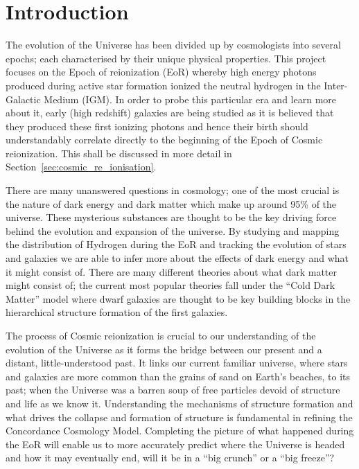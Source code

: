 
\section{Introduction} %
\label{section:Introduction}
	The evolution of the Universe has been divided up by cosmologists into several epochs; each characterised by their unique physical properties. This project focuses on the Epoch of reionization (EoR) whereby high energy photons produced during active star formation ionized the neutral hydrogen in the Inter-Galactic Medium (IGM). In order to probe this particular era and learn more about it, early (high redshift) galaxies are being studied as it is believed that they produced these first ionizing photons and hence their birth should understandably correlate directly to the beginning of the Epoch of Cosmic reionization. This shall be discussed in more detail in Section~\ref{sec:cosmic_re_ionisation}.

	There are many unanswered questions in cosmology; one of the most crucial is the nature of dark energy and dark matter which make up around 95\% of the universe\cite{WMAP9}. These mysterious substances are thought to be the key driving force behind the evolution and expansion of the universe. By studying and mapping the distribution of Hydrogen during the EoR and tracking the evolution of stars and galaxies we are able to infer more about the effects of dark energy and what it might consist of. There are many different theories about what dark matter might consist of; the current most popular theories fall under the ``Cold Dark Matter'' model where dwarf galaxies are thought to be key building blocks in the hierarchical structure formation of the first galaxies\cite{Cignoni}.

	The process of Cosmic reionization is crucial to our understanding of the evolution of the Universe as it forms the bridge between our present and a distant, little-understood past. It links our current familiar universe, where stars and galaxies are more common than the grains of sand on Earth's beaches, to its past; when the Universe was a barren soup of free particles devoid of structure and life as we know it. Understanding the mechanisms of structure formation and what drives the collapse and formation of structure is fundamental in refining the Concordance Cosmology Model. Completing the picture of what happened during the EoR will enable us to more accurately predict where the Universe is headed and how it may eventually end, will it be in a ``big crunch'' or a ``big freeze''?

